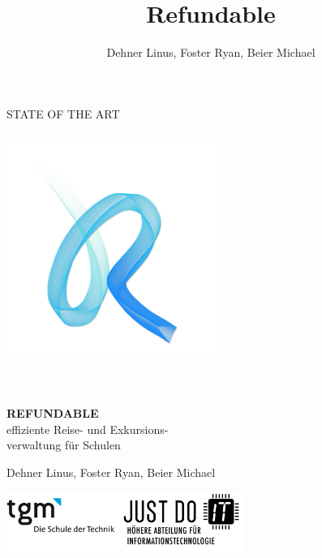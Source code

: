 \documentclass[minted, notitle]{protocol}
\title{Refundable}
\author{Dehner Linus, Foster Ryan, Beier Michael}
\begin{document}
\begin{titlepage} %
	\raggedleft %
	
	\begingroup \color{gray}{\rule{3pt}{\textheight}} \endgroup %
	\hspace{0.05\textwidth} %
	\parbox[b]{0.75\textwidth}{ %
		{{\fontsize{27}{48} \selectfont  STATE OF THE ART}}  \\ \\
		\includegraphics[width=200pt]{images/refundable_logo_klein.png} \\ \\ \\ \\
		{{\fontsize{50}{40} \bfseries \color{Cyan} REFUNDABLE}} \\[0.5\baselineskip] %
		{{\fontsize{20}{48} \selectfont effiziente Reise- und Exkursions-\\verwaltung für Schulen}} \\ [0.5\baselineskip] %
		{\vspace{-0.5cm}\large \begin{flushleft}Dehner Linus, Foster Ryan, Beier Michael\end{flushleft}} %
		{\vspace{0.3cm}\includegraphics[width=220pt]{images/tgm_full.png}}
	}
\end{titlepage}
\end{document}
